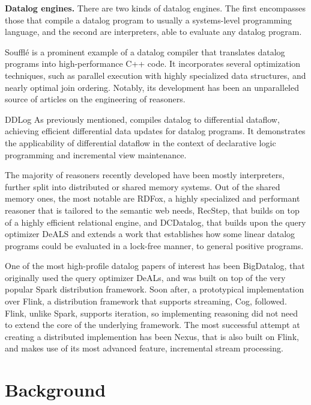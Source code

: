 \documentclass[sigconf,screen,review,natbib]{acmart}
\theoremstyle{definition}
\begin{document}
\textbf{Datalog engines.} There are two kinds of datalog engines. The first encompasses those that compile
a datalog program to usually a systems-level programming language, and the second are interpreters, able to
evaluate any datalog program.

Soufflé is a prominent example of a datalog compiler that translates datalog programs into high-performance
C++ code. It incorporates several optimization techniques, such as parallel execution with highly specialized data
structures\cite{souffle_btree}, and nearly optimal join ordering\cite{souffle_join}. Notably, its development has
been an unparalleled source of articles on the engineering of reasoners.

DDLog As previously mentioned, compiles datalog to differential dataflow, achieving efficient differential data updates
for datalog programs. It demonstrates the applicability of differential dataflow in the context of declarative logic
programming and incremental view maintenance.

The majority of reasoners recently developed have been mostly interpreters, further split into distributed or
shared memory systems. Out of the shared memory ones, the most notable are RDFox\cite{rdfox}, a highly specialized
and performant reasoner that is tailored to the semantic web needs, RecStep\cite{recstep}, that builds on top of a
highly efficient relational engine, and DCDatalog\cite{dcdatalog}, that builds upon the query optimizer DeALS\cite{deals}
and extends a work that establishes how some linear datalog programs could be evaluated in a lock-free manner, to
general positive programs.

One of the most high-profile datalog papers of interest has been BigDatalog\cite{bigdatalog}, that
originally used the query optimizer DeALs, and was built on top of the very popular Spark\cite{spark}
distribution framework. Soon after, a prototypical implementation\cite{cog} over Flink\cite{flink},
a distribution framework that supports streaming, Cog, followed. Flink, unlike Spark, supports
iteration, so implementing reasoning did not need to extend the core of the underlying framework. The most
successful attempt at creating a distributed implemention has been Nexus\cite{nexus}, that is also built on Flink,
and makes use of its most advanced feature, incremental stream processing.
\section{Background}
\end{document}

